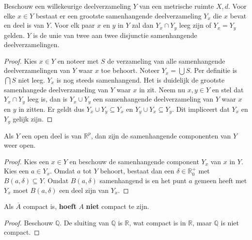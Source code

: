 \documentclass[main.tex]{subfiles}
\begin{document}
\begin{bpr}
  Beschouw een willekeurige deelverzameling $Y$ van een metrische ruimte $X,d$.
  Voor elke $x\in Y$ bestaat er een grootste samenhangende deelverzameling $Y_{x}$ die $x$ bevat en deel is van $Y$.
  Voor elk paar $x$ en $y$ in $Y$ zal dan $Y_{x} \cap Y_{y}$ leeg zijn of $Y_{x} = Y_{y}$ gelden.
  $Y$ is de unie van twee aan twee disjunctie samenhangende deelverzamelingen.

  \begin{proof}
    Kies $x\in Y$ en noteer met $S$ de verzameling van alle samenhangende deelverzamelingen van $Y$ waar $x$ toe behoort.
    Noteer $Y_{x} = \bigcup S$.
    Per definitie is $\bigcap S$ niet leeg.
    $Y_{x}$ is nog steeds samenhangend.
    Het is duidelijk de grootste samenhangede deelverzameling van $Y$ waar $x$ in zit.
    Neem nu $x,y\in Y$ en stel dat $Y_{x}\cap Y_{y}$ leeg is, dan is $Y_{x}\cup Y_{y}$ een samenhangende deelverzameling van $Y$ waar $x$ en $y$ in zitten.
    Er geldt dus $Y_{x} \cup Y_{y} \subseteq Y_{x}$ en $Y_{y} \cup Y_{x} \subseteq Y_{y}$.
    Dit impliceert dat $Y_{x}$ en $Y_{y}$ gelijk zijn.
  \end{proof}
\end{bpr}

\begin{bpr}
 Als $Y$ een open deel is van $\mathbb{R}^{p}$, dan zijn de samenhangende componenten van $Y$ weer open.

 \begin{proof}
   Kies een $x\in Y$ en beschouw de samenhangende component $Y_{x}$ van $x$ in $Y$.
   Kies een $a\in Y_{x}$.
   Omdat $a$ tot $Y$ behoort, bestaat dan een $\delta \in \mathbb{R}_{0}^{+}$ met $B(a,\delta) \subseteq Y$.
   Omdat $B(a,\delta)$ samenhangend is en het punt $a$ gemeen heeft met $Y_{x}$ moet $B(a,\delta)$ een deel zijn van $Y_{x}$.
 \end{proof}
\end{bpr}

\begin{gst}
  Als $\overline{A}$ compact is, \textbf{hoeft} $A$ \textbf{niet} compact te zijn.

  \begin{proof}
    Beschouw $\mathbb{Q}$.
    De sluiting van $\mathbb{Q}$ is $\mathbb{R}$, wat compact is in $\mathbb{R}$, maar $\mathbb{Q}$ is niet compact. 
  \end{proof}
\end{gst}
\end{document}
